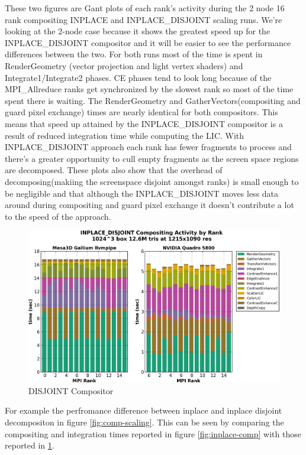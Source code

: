 \documentclass[a4paper,10pt]{article}
\begin{document}
These two figures are Gant plots of each rank's activity during the 2 node 16 rank compositing INPLACE and INPLACE\_DISJOINT scaling runs. We're looking at the 2-node case because it shows the greatest speed up for the INPLACE\_DISJOINT compositor and it will be easier to see the performance differences between the two. For both runs most of the time is spent in RenderGeometry (vector projection and light vertex shaders) and Integrate1/Integrate2 phases. CE phases tend to look long because of the MPI\_Allreduce ranks get synchronized by the slowest rank so most of the time spent there is waiting. The RenderGeometry and GatherVectors(compositing and guard pixel exchange) times are nearly identical for both compositors. This means that speed up attained by the INPLACE\_DISJOINT compositor is a result of reduced integration time while computing the LIC. With INPLACE\_DISJOINT approach each rank has fewer fragments to process and there's a greater opportunity to cull empty fragments as the screen space regions are decomposed. These plots also show that the overhead of decomposing(makiing the screenspace disjoint amongst ranks) is small enough to be negligible and that although the INPLACE\_DISJOINT moves less data around during compositing and guard pixel exchange it doesn't contribute a lot to the speed of the approach.

\begin{figure}[h]
 \centering
 \includegraphics[width=1.0\textwidth]{./scaling-gant-inplace-disjoint-composite-gpu-mesa.png}
 \caption{DISJOINT Compositor}
 \label{fig:disj-comp}
\end{figure}

For example the perfromance difference between inplace and inplace disjoint decompositon in figure \ref{fig:comp-scaling}. This can be seen by comparing the compositing and integration times reported in figure \ref{fig:inplace-comp} with those reported in \ref{fig:disj-comp}.
\end{document}
